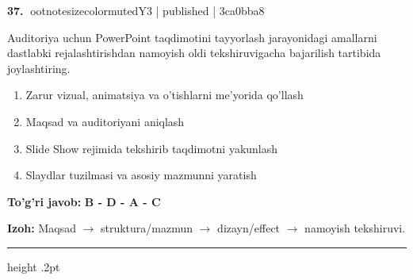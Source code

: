 \documentclass[10pt,a4paper]{article}
\begin{document}
\textbf{\color{ink}37.} {ootnotesizecolor{muted}Y3 | published | 3ca0bba8}
\par
Auditoriya uchun PowerPoint taqdimotini tayyorlash jarayonidagi amallarni dastlabki rejalashtirishdan namoyish oldi tekshiruvigacha bajarilish tartibida joylashtiring.
\begin{enumerate}[label=\Alph*),leftmargin=9mm]
\item Zarur vizual, animatsiya va o'tishlarni me'yorida qo'llash
\item Maqsad va auditoriyani aniqlash
\item Slide Show rejimida tekshirib taqdimotni yakunlash
\item Slaydlar tuzilmasi va asosiy mazmunni yaratish
\end{enumerate}
\begin{tcolorbox}[enhanced,breakable,colback=teal!4,colframe=teal!55!black,boxrule=0.45pt,arc=1.2mm,left=2.8mm,right=2.8mm,top=2mm,bottom=2mm]
\textbf{\color{teal}To'g'ri javob:} \textbf{B - D - A - C}
\par\smallskip
\textbf{Izoh:} Maqsad \ensuremath{\rightarrow} struktura/mazmun \ensuremath{\rightarrow} dizayn/effect \ensuremath{\rightarrow} namoyish tekshiruvi.
\end{tcolorbox}
\vspace{2mm}\hrule height .2pt\vspace{2mm}
\end{document}
